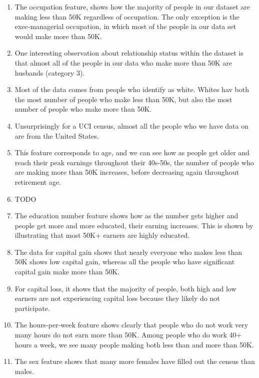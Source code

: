 \documentclass[letterpaper]{article}
\theoremstyle{definition}
\begin{document}
\begin{enumerate}
\begin{enumerate}
\begin{enumerate}
\item The occupation feature, shows how the majority of people in
our dataset are making less than 50K regardless of occupation.
The only exception is the exec-managerial occupation, in which
most of the people in our data set would make more than 50K.

\item One interesting observation about relationship status within
the dataset is that almost all of the people in our data who
make more than 50K are husbands (category 3).

\item Most of the data comes from people who identify as white.
Whites hav both the most number of people who make less than 50K,
but also the most number of people who make more than 50K.

\item Unsurprisingly for a UCI census, almost all the people who we
have data on are from the United States.

\item This feature corresponds to age, and we can see how as people
get older and reach their peak earnings throughout their
40s-50s, the number of people who are making more than 50K
increases, before decreasing again throughout retirement age.

\item TODO

\item The education number feature shows how as the number gets
higher and people get more and more educated, their earning
increases. This is shown by illustrating that most 50K+
earners are highly educated.

\item The data for capital gain shows that nearly everyone who
makes less than 50K shows low capital gain, whereas all the
people who have significant capital gain make more than 50K.

\item For capital loss, it shows that the majority of people, both
high and low earners are not experiencing capital loss
because they likely do not participate.

\item The hours-per-week feature shows clearly that people who do
not work very many hours do not earn more than 50K. Among
people who do work 40+ hours a week, we see many people
making both less than and more than 50K.

\item The sex feature shows that many more females have filled out
the census than males.
\end{enumerate}


\end{enumerate}
\end{enumerate}
\end{document}
